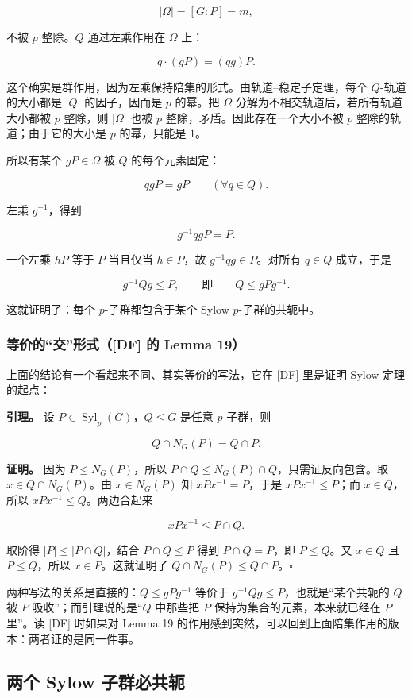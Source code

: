 \[
|\Omega|=[G:P]=m,
\]

不被 $p$ 整除。$Q$ 通过左乘作用在 $\Omega$ 上：

\[
q\cdot(gP)=(qg)P.
\]

这个确实是群作用，因为左乘保持陪集的形式。由轨道--稳定子定理，每个 $Q$-轨道的大小都是 $|Q|$ 的因子，因而是 $p$ 的幂。把 $\Omega$ 分解为不相交轨道后，若所有轨道大小都被 $p$ 整除，则 $|\Omega|$ 也被 $p$ 整除，矛盾。因此存在一个大小不被 $p$ 整除的轨道；由于它的大小是 $p$ 的幂，只能是 $1$。

所以有某个 $gP\in\Omega$ 被 $Q$ 的每个元素固定：

\[
qgP=gP\qquad(\forall q\in Q).
\]

左乘 $g^{-1}$，得到

\[
g^{-1}qgP=P.
\]

一个左乘 $hP$ 等于 $P$ 当且仅当 $h\in P$，故 $g^{-1}qg\in P$。对所有 $q\in Q$ 成立，于是

\[
g^{-1}Qg\le P,
\qquad\text{即}\qquad
Q\le gPg^{-1}.
\]

这就证明了：每个 $p$-子群都包含于某个 Sylow $p$-子群的共轭中。

\subsubsection{等价的“交”形式（[DF] 的 Lemma 19）}


上面的结论有一个看起来不同、其实等价的写法，它在 [DF] 里是证明 Sylow 定理的起点：

\textbf{引理。} 设 $P\in\operatorname{Syl}_p(G)$，$Q\le G$ 是任意 $p$-子群，则

\[
Q\cap N_G(P)=Q\cap P.
\]

\textbf{证明。} 因为 $P\le N_G(P)$，所以 $P\cap Q\le N_G(P)\cap Q$，只需证反向包含。取 $x\in Q\cap N_G(P)$。由 $x\in N_G(P)$ 知 $xPx^{-1}=P$，于是 $xPx^{-1}\le P$；而 $x\in Q$，所以 $xPx^{-1}\le Q$。两边合起来

\[
xPx^{-1}\le P\cap Q.
\]

取阶得 $|P|\le|P\cap Q|$，结合 $P\cap Q\le P$ 得到 $P\cap Q=P$，即 $P\le Q$。又 $x\in Q$ 且 $P\le Q$，所以 $x\in P$。这就证明了 $Q\cap N_G(P)\le Q\cap P$。$\square$

两种写法的关系是直接的：$Q\le gPg^{-1}$ 等价于 $g^{-1}Qg\le P$，也就是“某个共轭的 $Q$ 被 $P$ 吸收”；而引理说的是“$Q$ 中那些把 $P$ 保持为集合的元素，本来就已经在 $P$ 里”。读 [DF] 时如果对 Lemma 19 的作用感到突然，可以回到上面陪集作用的版本：两者证的是同一件事。

\subsection{两个 Sylow 子群必共轭}


